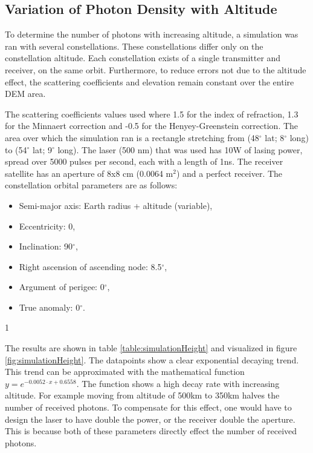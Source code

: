 \subsection{Variation of Photon Density with Altitude}
\label{sec:VariationOfPhotonDensity}

To determine the number of photons with increasing altitude, a simulation was ran with several constellations. These constellations differ only on the constellation altitude. Each constellation exists of a single transmitter and receiver, on the same orbit. Furthermore, to reduce errors not due to the altitude effect, the scattering coefficients and elevation remain constant over the entire \ac{DEM} area.

The scattering coefficients values used where 1.5 for the index of refraction, 1.3 for the Minnaert correction and -0.5 for the Henyey-Greenstein correction. The area over which the simulation ran is a rectangle stretching from (48$^\circ$ lat; 8$^\circ$ long) to (54$^\circ$ lat; 9$^\circ$ long). The \ac{laser} (500 nm) that was used has 10W of lasing power, spread over 5000 pulses per second, each with a length of 1ns. The receiver satellite has an aperture of 8x8 cm (0.0064 m$^2$) and a perfect receiver. The constellation orbital parameters are as follows:

\begin{itemize}
	\item Semi-major axis:	Earth radius + altitude (variable),
	\item Eccentricity: 0,
	\item Inclination: 90$^\circ$,
	\item Right ascension of ascending node: 8.5$^\circ$,
	\item Argument of perigee: 0$^\circ$,
	\item True anomaly: 0$^\circ$.
\end{itemize}1

The results are shown in table \ref{table:simulationHeight} and visualized in figure \ref{fig:simulationHeight}. The datapoints show a clear exponential decaying trend. This trend can be approximated with the mathematical function $y=e^{-0.0052 \cdot x + 0.6558}$. The function shows a high decay rate with increasing altitude. For example moving from altitude of 500km to 350km halves the number of received photons. To compensate for this effect, one would have to design the \ac{laser} to have double the power, or the receiver double the aperture. This is because both of these parameters directly effect the number of received photons. 

